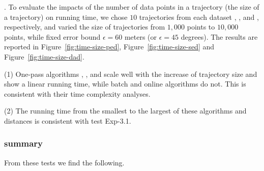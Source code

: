 .
To evaluate the impacts of the number of data points in a trajectory (\ie the size of a trajectory) on running time,
we chose $10$ trajectories from each dataset \taxi, \ucar, \geolife and \mopsi, respectively,
and varied the size  of trajectories from $1,000$ points to $10,000$ points, while fixed error bound $\epsilon = 60$ meters ({or $\epsilon = 45$ degrees}).
The results are reported in Figure~\ref{fig:time-size-ped}, Figure~\ref{fig:time-size-sed} and Figure~\ref{fig:time-size-dad}.

\sstab(1) One-pass algorithms \siped, \operb, \cised and \interval scale well with the increase of trajectory size  and show a linear running time, while batch and online algorithms do not.
This is consistent with their time complexity analyses.

\sstab(2) The running time from the smallest to the largest of these algorithms and distances is consistent with test {Exp-3.1}.





\subsubsection{summary}
From these tests we find the following.

